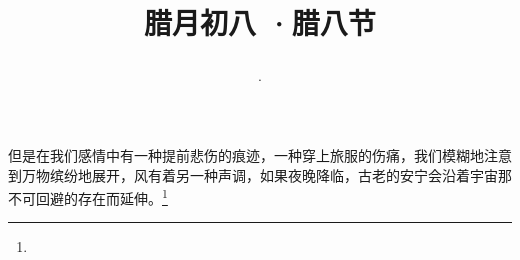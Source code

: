 \title{\date[d=18,m=1,y=2024][year:cn-y,年,month:cn,day:cn,日,·,weekday]·腊月初八 ·腊八节}
但是在我们感情中有一种提前悲伤的痕迹，一种穿上旅服的伤痛，我们模糊地注意到万物缤纷地展开，风有着另一种声调，如果夜晚降临，古老的安宁会沿着宇宙那不可回避的存在而延伸。\footnote{ }


